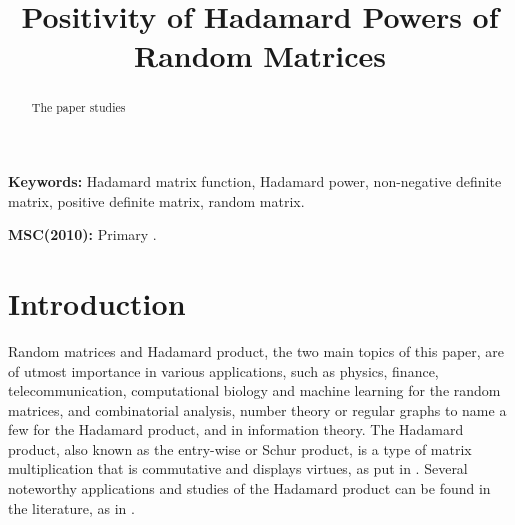 \documentclass[conference,letterpaper]{IEEEtran}
\numberwithin{equation}{section}
\begin{document}
\title{Positivity of Hadamard Powers of Random Matrices}


\author{%
  \and
}



\maketitle


\begin{abstract}
\noindent The paper studies
\end{abstract}



\noindent\textbf{Keywords:} Hadamard matrix function, Hadamard power, non-negative definite matrix, positive definite matrix, random matrix.

\medskip

\noindent\textbf{MSC(2010):} Primary .\\
[0.5cm]


\section{Introduction}
Random matrices and Hadamard product, the two main topics of this paper, are of utmost importance in various applications, such as physics, finance, telecommunication, computational biology and machine learning for the random matrices, and combinatorial analysis, number theory or regular graphs to name a few for the Hadamard product, and in information theory.
The Hadamard product, also known as the entry-wise or Schur product, is a type of matrix multiplication that is commutative and displays  virtues, as put in \cite{horadam2012hadamard}. 
Several noteworthy applications and studies of the Hadamard product can be found in the literature, as in \cite{hedayat1978hadamard,agaian2006hadamard,bulutoglu2009counterexample,audenaert2010spectral}.
\end{document}
